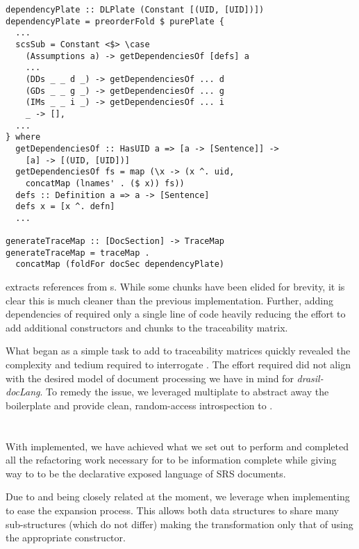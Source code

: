 \begin{tcolorbox}[breakable, toprule at break=0pt, bottomrule at break=0pt]
\begin{verbatim}
dependencyPlate :: DLPlate (Constant [(UID, [UID])])
dependencyPlate = preorderFold $ purePlate {
  ...
  scsSub = Constant <$> \case
    (Assumptions a) -> getDependenciesOf [defs] a
    ...
    (DDs _ _ d _) -> getDependenciesOf ... d
    (GDs _ _ g _) -> getDependenciesOf ... g
    (IMs _ _ i _) -> getDependenciesOf ... i
    _ -> [],
  ...
} where
  getDependenciesOf :: HasUID a => [a -> [Sentence]] ->
    [a] -> [(UID, [UID])]
  getDependenciesOf fs = map (\x -> (x ^. uid,
    concatMap (lnames' . ($ x)) fs))
  defs :: Definition a => a -> [Sentence]
  defs x = [x ^. defn]
  ...

generateTraceMap :: [DocSection] -> TraceMap
generateTraceMap = traceMap .
  concatMap (foldFor docSec dependencyPlate)
\end{verbatim}
\end{tcolorbox}

 extracts references from s. While some chunks have been elided for brevity, it is clear this is much cleaner than the previous implementation. Further, adding dependencies of  required only a single line of code heavily reducing the effort to add additional constructors and chunks to the traceability matrix.

What began as a simple task to add  to traceability matrices quickly revealed the complexity and tedium required to interrogate . The effort required did not align with the desired model of document processing we have in mind for \textit{drasil-docLang}. To remedy the issue, we leveraged multiplate to abstract away the boilerplate and provide clean, random-access introspection to .

\section{}\label{dlSRSDecl}
With  implemented, we have achieved what we set out to perform and completed all the refactoring work necessary for  to be information complete while giving way to  to be the declarative exposed language of SRS documents.

Due to  and  being closely related at the moment, we leverage  when implementing  to ease the expansion process. This allows both data structures to share many sub-structures (which do not differ) making the transformation only that of using the appropriate constructor. 

